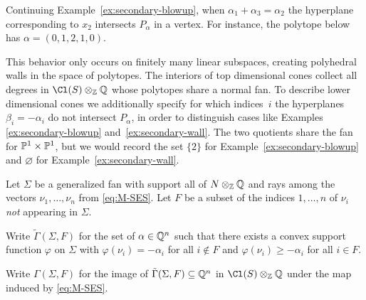 \documentclass{article}
\begin{document}
\begin{example}\label{ex:secondary-wall}
  Continuing Example~\ref{ex:secondary-blowup}, when $\alpha_1+\alpha_3=\alpha_2$ the hyperplane corresponding to $x_2$ intersects $P_\alpha$ in a vertex.  For instance, the polytope below has $\alpha=(0,1,2,1,0)$.
  \begin{center}
  \end{center}
\end{example}

This behavior only occurs on finitely many linear subspaces, creating polyhedral walls in the space of polytopes.  The interiors of top dimensional cones collect all degrees in $\Cl(S)\otimes_\ZZ\QQ$ whose polytopes share a normal fan.  To describe lower dimensional cones we additionally specify for which indices~$i$ the hyperplanes $\beta_i=-\alpha_i$ do not intersect $P_\alpha$, in order to distinguish cases like Examples  \ref{ex:secondary-blowup} and~\ref{ex:secondary-wall}.  The two quotients share the fan for $\mathbb P^1\times\mathbb P^1$, but we would record the set $\{2\}$ for Example~\ref{ex:secondary-blowup} and $\varnothing$ for Example~\ref{ex:secondary-wall}.

\begin{defn}\label{def:GKZ-cones}
  Let $\Sigma$ be a generalized fan with support all of $N\otimes_\mathbb Z\mathbb Q$ and rays among the vectors $\nu_1,\ldots,\nu_n$ from \eqref{eq:M-SES}.  Let $F$ be a subset of the indices $1,\ldots,n$ of $\nu_i$ \emph{not} appearing in $\Sigma$.

  Write $\tilde\Gamma(\Sigma,F)$ for the set of $\alpha\in\mathbb Q^n$ such that there exists a convex support function $\varphi$ on $\Sigma$ with $\varphi(\nu_i)=-\alpha_i$ for all $i\notin F$ and $\varphi(\nu_i)\geq-\alpha_i$ for all $i\in F$.


  Write $\Gamma(\Sigma,F)$ for the image of $\tilde\Gamma(\Sigma,F)\subseteq\mathbb Q^n$ in $\Cl(S)\otimes_\ZZ\QQ$ under the map induced by \eqref{eq:M-SES}.
\end{defn}
\end{document}
